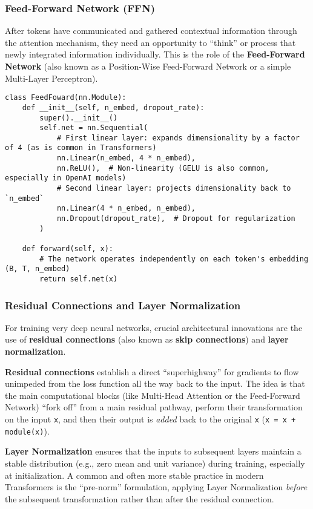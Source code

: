 \subsubsection{Feed-Forward Network (FFN)}

After tokens have communicated and gathered contextual information through the attention mechanism, they need an opportunity to ``think'' or process that newly integrated information individually. This is the role of the \textbf{Feed-Forward Network} (also known as a Position-Wise Feed-Forward Network or a simple Multi-Layer Perceptron).

\begin{lstlisting}[caption={FeedFoward implementation}]
class FeedFoward(nn.Module):
    def __init__(self, n_embed, dropout_rate):
        super().__init__()
        self.net = nn.Sequential(
            # First linear layer: expands dimensionality by a factor of 4 (as is common in Transformers)
            nn.Linear(n_embed, 4 * n_embed),
            nn.ReLU(),  # Non-linearity (GELU is also common, especially in OpenAI models)
            # Second linear layer: projects dimensionality back to `n_embed`
            nn.Linear(4 * n_embed, n_embed), 
            nn.Dropout(dropout_rate),  # Dropout for regularization
        )

    def forward(self, x):
        # The network operates independently on each token's embedding (B, T, n_embed)
        return self.net(x)
\end{lstlisting}

\subsubsection{Residual Connections and Layer Normalization}

For training very deep neural networks, crucial architectural innovations are the use of \textbf{residual connections} (also known as \textbf{skip connections}) and \textbf{layer normalization}.

\textbf{Residual connections} establish a direct ``superhighway'' for gradients to flow unimpeded from the loss function all the way back to the input. The idea is that the main computational blocks (like Multi-Head Attention or the Feed-Forward Network) ``fork off'' from a main residual pathway, perform their transformation on the input \texttt{x}, and then their output is \textit{added} back to the original \texttt{x} (\texttt{x = x + module(x)}).

\textbf{Layer Normalization} ensures that the inputs to subsequent layers maintain a stable distribution (e.g., zero mean and unit variance) during training, especially at initialization. A common and often more stable practice in modern Transformers is the ``pre-norm'' formulation, applying Layer Normalization \textit{before} the subsequent transformation rather than after the residual connection.

